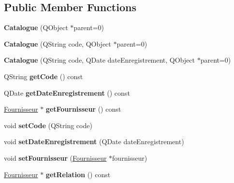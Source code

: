 \subsection*{Public Member Functions}
\begin{DoxyCompactItemize}
\item 
\hypertarget{class_catalogue_a099665eeee3b1f0c80a929d2a85cf3f2}{
{\bfseries Catalogue} (QObject $\ast$parent=0)}
\label{db/d2b/class_catalogue_a099665eeee3b1f0c80a929d2a85cf3f2}

\item 
\hypertarget{class_catalogue_ac98ee6330c7b84635e9c308f3a6118ae}{
{\bfseries Catalogue} (QString code, QObject $\ast$parent=0)}
\label{db/d2b/class_catalogue_ac98ee6330c7b84635e9c308f3a6118ae}

\item 
\hypertarget{class_catalogue_acc8d324b1298f205e14f7dd7b337221b}{
{\bfseries Catalogue} (QString code, QDate dateEnregistrement, QObject $\ast$parent=0)}
\label{db/d2b/class_catalogue_acc8d324b1298f205e14f7dd7b337221b}

\item 
\hypertarget{class_catalogue_ae815e3fcfb3a6a4ea9e64b101e69dded}{
QString {\bfseries getCode} () const }
\label{db/d2b/class_catalogue_ae815e3fcfb3a6a4ea9e64b101e69dded}

\item 
\hypertarget{class_catalogue_ac9a9fc872e3ac85de35a053ec10e5cee}{
QDate {\bfseries getDateEnregistrement} () const }
\label{db/d2b/class_catalogue_ac9a9fc872e3ac85de35a053ec10e5cee}

\item 
\hypertarget{class_catalogue_a8c16aa5c87524a2b34c54345a91e45e6}{
\hyperlink{class_fournisseur}{Fournisseur} $\ast$ {\bfseries getFournisseur} () const }
\label{db/d2b/class_catalogue_a8c16aa5c87524a2b34c54345a91e45e6}

\item 
\hypertarget{class_catalogue_aa39c0a0dcd5d11461a5c95a41e4e74dd}{
void {\bfseries setCode} (QString code)}
\label{db/d2b/class_catalogue_aa39c0a0dcd5d11461a5c95a41e4e74dd}

\item 
\hypertarget{class_catalogue_a2e6146f3ebebe972b347986bab8c73a2}{
void {\bfseries setDateEnregistrement} (QDate dateEnregistrement)}
\label{db/d2b/class_catalogue_a2e6146f3ebebe972b347986bab8c73a2}

\item 
\hypertarget{class_catalogue_ad574279d2b6f3f7d43847c358aa80f6b}{
void {\bfseries setFournisseur} (\hyperlink{class_fournisseur}{Fournisseur} $\ast$fournisseur)}
\label{db/d2b/class_catalogue_ad574279d2b6f3f7d43847c358aa80f6b}

\item 
\hypertarget{class_catalogue_af0fa2e758bc358ebd56e94ae8fb0d03b}{
\hyperlink{class_fournisseur}{Fournisseur} $\ast$ {\bfseries getRelation} () const }
\label{db/d2b/class_catalogue_af0fa2e758bc358ebd56e94ae8fb0d03b}

\end{DoxyCompactItemize}

